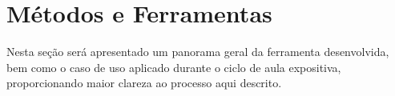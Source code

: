 \section{Métodos e Ferramentas}\label{sec:metodologia}
Nesta seção será apresentado um panorama geral da ferramenta desenvolvida, bem como o caso de uso aplicado durante o ciclo de aula expositiva, proporcionando maior clareza ao processo aqui descrito.







